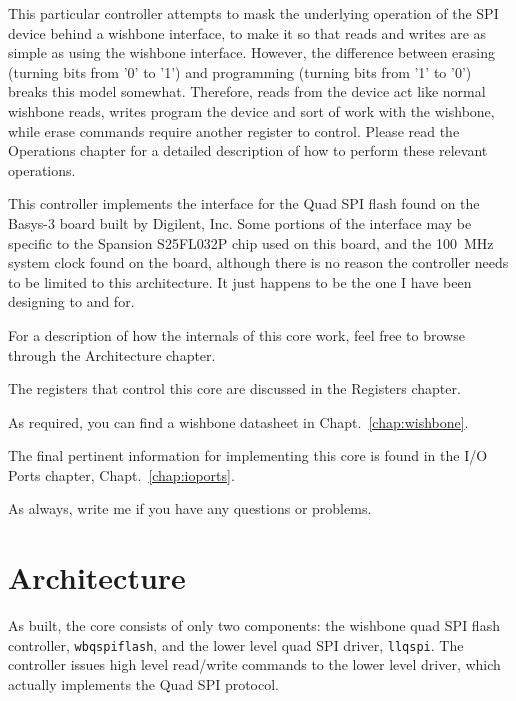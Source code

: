 \documentclass{gqtekspec}
\begin{document}
This particular controller attempts to mask the underlying operation of the
SPI device behind a wishbone interface, to make it so that reads and writes
are as simple as using the wishbone interface.  However, the difference
between erasing (turning bits from '0' to '1') and programming (turning bits
from '1' to '0') breaks this model somewhat.  Therefore, reads from the 
device act like normal wishbone reads, writes program the device and
sort of work with the wishbone, while erase commands require another register
to control.  Please read the Operations chapter for a detailed description
of how to perform these relevant operations.

This controller implements the interface for the Quad SPI flash found on the
Basys-3 board built by Digilent, Inc.  Some portions of the interface may
be specific to the Spansion S25FL032P chip used on this board, and the
100~MHz system clock found on the board, although there is no reason the
controller needs to be limited to this architecture.  It just happens to be
the one I have been designing to and for.  

For a description of how the internals of this core work, feel free to browse
through the Architecture chapter.

The registers that control this core are discussed in the Registers chapter.

As required, you can find a wishbone datasheet in Chapt.~\ref{chap:wishbone}.

The final pertinent information for implementing this core is found in the
I/O Ports chapter, Chapt.~\ref{chap:ioports}.

As always, write me if you have any questions or problems.

\chapter{Architecture}\label{chap:arch}

As built, the core consists of only two components: the wishbone quad SPI
flash controller, {\tt wbqspiflash}, and the lower level quad SPI driver,
{\tt llqspi}.  The controller issues high level read/write commands to the
lower level driver, which actually implements the Quad SPI protocol.
\end{document}

